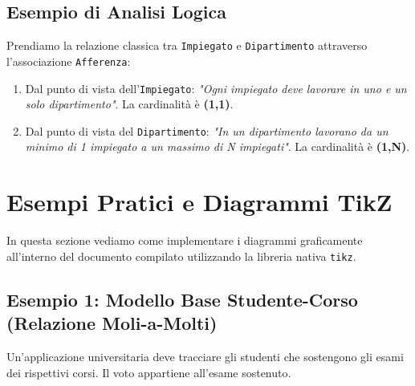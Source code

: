 \subsection{Esempio di Analisi Logica}
Prendiamo la relazione classica tra \texttt{Impiegato} e \texttt{Dipartimento} attraverso l'associazione \texttt{Afferenza}:
\begin{enumerate}
    \item Dal punto di vista dell'\texttt{Impiegato}: \textit{"Ogni impiegato deve lavorare in uno e un solo dipartimento"}. La cardinalità è \textbf{(1,1)}.
    \item Dal punto di vista del \texttt{Dipartimento}: \textit{"In un dipartimento lavorano da un minimo di 1 impiegato a un massimo di N impiegati"}. La cardinalità è \textbf{(1,N)}.
\end{enumerate}

\section{Esempi Pratici e Diagrammi TikZ}

In questa sezione vediamo come implementare i diagrammi graficamente all'interno del documento compilato utilizzando la libreria nativa \texttt{tikz}.

\subsection{Esempio 1: Modello Base Studente-Corso (Relazione Moli-a-Molti)}
Un'applicazione universitaria deve tracciare gli studenti che sostengono gli esami dei rispettivi corsi. Il voto appartiene all'esame sostenuto.

